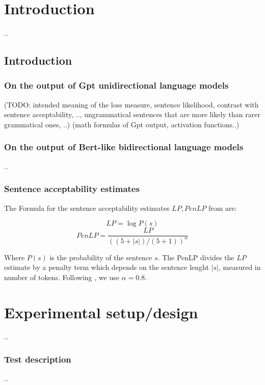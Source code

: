 \chapter{Introduction}

..

\section{Introduction}

\subsection{On the output of Gpt unidirectional language models}
(TODO: intended meaning of the loss measure, sentence likelihood, contrast with sentence acceptability, .., ungrammatical sentences that are more likely than rarer grammatical ones, ..)
(math formulas of Gpt output, activation functions..)

\subsection{On the output of Bert-like bidirectional language models}
..

\subsection{Sentence acceptability estimates}

The Formula for the sentence acceptability estimates \( LP, PenLP \) from \citet{lau2020furiously} are:

\begin{displaymath}
	LP = \log P(s)
\end{displaymath}
\begin{displaymath}
	PenLP = \frac{LP}{((5+|s|) \big/ (5+1))^\alpha}
\end{displaymath}

Where \( P(s) \) is the probability of the sentence \( s \). The PenLP divides the \( LP \) estimate by a penalty term which depends on the sentence lenght \( |s| \), measured in number of tokens. Following \citet{lau2020furiously}, we use \( \alpha=0.8 \).


\chapter{Experimental setup/design}
..

\subsection{Test description}
..

